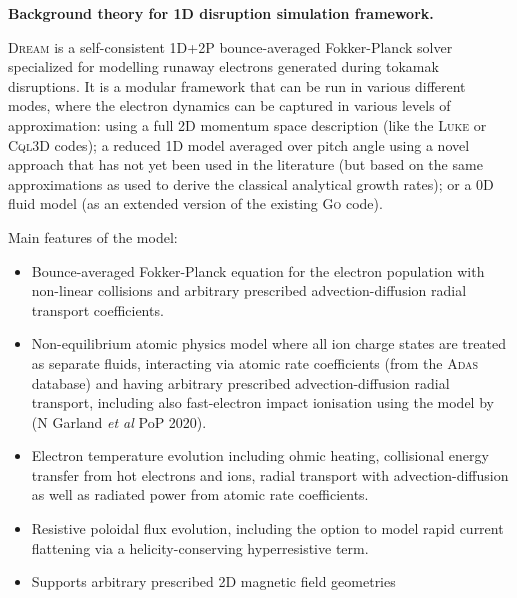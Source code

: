 \documentclass[11pt,a4paper]{article}
\begin{document}
\begin{center}
\Large \bf Background theory for 1D disruption simulation framework.
\end{center}

\vspace{10mm}

\textsc{Dream} is a self-consistent 1D+2P bounce-averaged Fokker-Planck solver specialized for modelling runaway electrons generated during tokamak disruptions. It is a modular framework that can be run in various different modes, where the electron dynamics can be captured in various levels of approximation: using a full 2D momentum space description (like the \textsc{Luke} or \textsc{Cql3D} codes); a reduced 1D model averaged over pitch angle using a novel approach that has not yet been used in the literature (but based on the same approximations as used to derive the classical analytical growth rates); or a 0D fluid model (as an extended version of the existing \textsc{Go} code).

Main features of the model:
\begin{itemize}
\item Bounce-averaged Fokker-Planck equation for the electron population with non-linear collisions and arbitrary prescribed advection-diffusion radial transport coefficients.
\item Non-equilibrium atomic physics model where all ion charge states are treated as separate fluids, interacting via atomic rate coefficients (from the \textsc{Adas} database) and having arbitrary prescribed advection-diffusion radial transport, including also fast-electron impact ionisation using the model by (N Garland \emph{et al} PoP 2020).
\item Electron temperature evolution including ohmic heating, collisional energy transfer from hot electrons and ions, radial transport with advection-diffusion as well as radiated power from atomic rate coefficients. 
\item Resistive poloidal flux evolution, including the option to model rapid current flattening via a helicity-conserving hyperresistive term.
\item Supports arbitrary prescribed 2D magnetic field geometries
\end{itemize}


\tableofcontents
\end{document}
